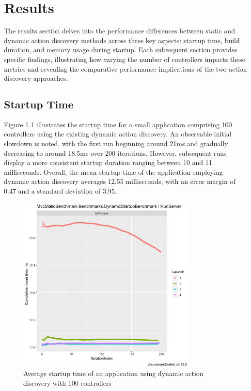 \chapter{Results}

The results section delves into the performance differences between static and dynamic action discovery methods across three key aspects: startup time, build duration, and memory usage during startup. Each subsequent section provides specific findings, illustrating how varying the number of controllers impacts these metrics and revealing the comparative performance implications of the two action discovery approaches.

\section{Startup Time}

Figure \ref{fig:dynamic-startup-100} illustrates the startup time for a small application comprising 100 controllers using the existing dynamic action discovery. An observable initial slowdown is noted, with the first run beginning around 21ms and gradually decreasing to around 18.5ms over 200 iterations. However, subsequent runs display a more consistent startup duration ranging between 10 and 11 milliseconds. Overall, the mean startup time of the application employing dynamic action discovery averages 12.55 milliseconds, with an error margin of 0.47 and a standard deviation of 3.95.

\begin{figure}[H]
\centering
\includegraphics[width=0.8\textwidth]{graphics/MvcStaticBenchmark.Benchmarks.DynamicStartupBenchmark-RunServer-cummean.png}
\caption{Average startup time of an application using dynamic action discovery with 100 controllers}
\label{fig:dynamic-startup-100}
\end{figure}

